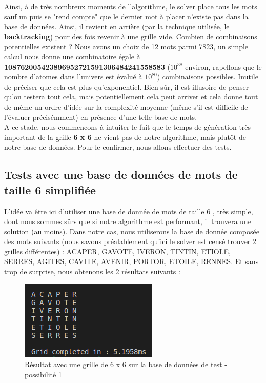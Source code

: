 \documentclass [ 11 pt ] {article}
\begin{document}
        Ainsi, à de très nombreux moments de l'algorithme, le solver place tous les mots sauf un puis se "rend compte" que le dernier mot à placer n'existe pas dans la base de données. Ainsi, il revient en arrière (par la technique utilisée, le \textbf{backtracking}) pour des fois revenir à une grille vide. Combien de combinaisons potentielles existent ? Nous avons un choix de 12 mots parmi 7823, un simple calcul nous donne une combinatoire égale à \textbf{108762005423896952721591306484241558583} ($10^{38}$ environ, rapellons que le nombre d'atomes dans l'univers est évalué à $10^{80}$) combinaisons possibles. Inutile de préciser que cela est plus qu'exponentiel. Bien sûr, il est illusoire de penser qu'on testera tout cela, mais potentiellement cela peut arriver et cela donne tout de même un ordre d'idée sur la complexité moyenne (même s'il est difficile de l'évaluer précisémment) en présence d'une telle base de mots. \\
        
        A ce stade, nous commencons à intuiter le fait que le temps de génération très important de la grille \textbf{6 x 6} ne vient pas de notre algorithme, mais plutôt de notre base de données. Pour le confirmer, nous allons effectuer des tests. \\
        
        \subsection{Tests avec une base de données de mots de taille 6 simplifiée}
        
        \hspace*{0.6cm} L'idée va être ici d'utiliser une base de donnée de mots de taille 6 , très simple, dont nous sommes sûrs que si notre algorithme est performant, il trouvera une solution (au moins). Dans notre cas, nous utiliserons la base de donnée composée des mots suivants (nous savons préalablement qu'ici le solver est censé trouver 2 grilles différentes) : {ACAPER, GAVOTE, IVERON, TINTIN, ETIOLE, SERRES, AGITES, CAVITE, AVENIR, PORTOR, ETOILE, RENNES}. Et sans trop de surprise, nous obtenons les 2 résultats suivants :
        
        \begin{figure}[H] 
            \center 
            \includegraphics[width=0.3\linewidth]{grid_1.png}
            \caption{Résultat avec une grille de 6 x 6 sur la base de données de test - possibilité 1}
        \end{figure}
        
\end{document}
